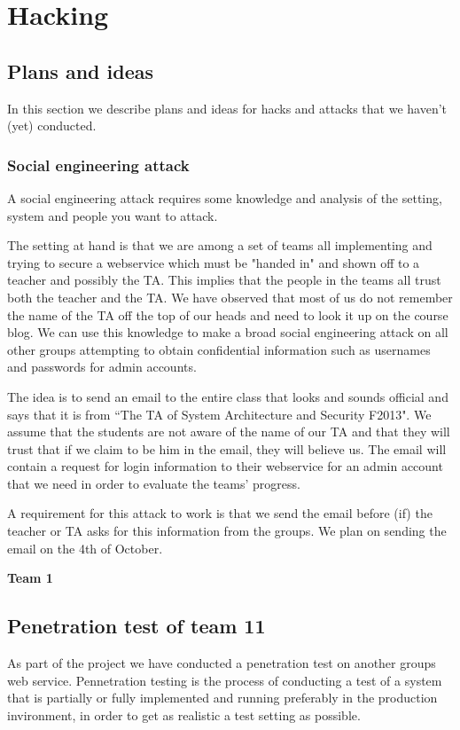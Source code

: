 \documentclass[a4paper]{article}
\begin{document}
\section{Hacking}
\subsection{Plans and ideas}
In this section we describe plans and ideas for hacks and attacks that we haven't (yet) conducted.
\subsubsection{Social engineering attack}
A social engineering attack requires some knowledge and analysis of the setting, system and people you want to attack.

The setting at hand is that we are among a set of teams all implementing and trying to secure a webservice which must be "handed in" and shown off to a teacher and possibly the TA. This implies that the people in the teams all trust both the teacher and the TA. We have observed that most of us do not remember the name of the TA off the top of our heads and need to look it up on the course blog.
We can use this knowledge to make a broad social engineering attack on all other groups attempting to obtain confidential information such as usernames and passwords for admin accounts.

The idea is to send an email to the entire class that looks and sounds official and says that it is from ``The TA of System Architecture and Security F2013". We assume that the students are not aware of the name of our TA and that they will trust that if we claim to be him in the email, they will believe us. The email will contain a request for login information to their webservice for an admin account that we need in order to evaluate the teams' progress.

A requirement for this attack to work is that we send the email before (if) the teacher or TA asks for this information from the groups. We plan on sending the email on the 4th of October.


\textbf{Team 1}

\subsection{Penetration test of team 11}
As part of the project we have conducted a penetration test on another groups web service.
Pennetration testing is the process of conducting a test of a system that is partially or fully implemented and running preferably in the production invironment, in order to get as realistic a test setting as possible.
\end{document}
